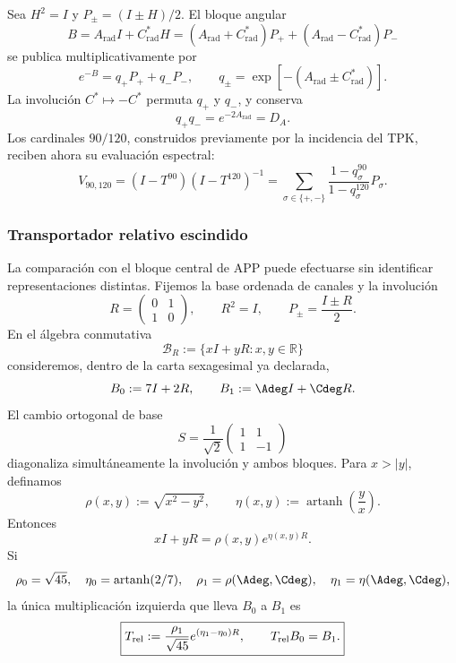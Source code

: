 Sea \(H^2=I\) y \(P_\pm=(I\pm H)/2\). El bloque angular
\begin{equation}
 B=A_{\mathrm{rad}}I+C^*_{\mathrm{rad}}H
 =(A_{\mathrm{rad}}+C^*_{\mathrm{rad}})P_+
 +(A_{\mathrm{rad}}-C^*_{\mathrm{rad}})P_-
 \label{eq:l9s102:b-angular}
\end{equation}
se publica multiplicativamente por
\begin{equation}
 e^{-B}=q_+P_++q_-P_-,
 \qquad
 q_\pm=\exp[-(A_{\mathrm{rad}}\pm C^*_{\mathrm{rad}})].
 \label{eq:l9s102:qpm-angular}
\end{equation}
La involución \(C^*\mapsto-C^*\) permuta \(q_+\) y \(q_-\), y conserva
\begin{equation}
 q_+q_-=e^{-2A_{\mathrm{rad}}}=D_A.
 \label{eq:l9s102:det-angular}
\end{equation}
Los cardinales \(90/120\), construidos previamente por la incidencia del
TPK, reciben ahora su evaluación espectral:
\begin{equation}
 V_{90,120}
 =(I-T^{90})(I-T^{120})^{-1}
 =\sum_{\sigma\in\{+,-\}}
 \frac{1-q_\sigma^{90}}{1-q_\sigma^{120}}P_\sigma.
 \label{eq:l9s102:v90120-posterior}
\end{equation}
\subsubsection{Transportador relativo escindido}
\label{sec:s102:c38:6:3:1}

\label{p3-20260826:sec:transportador-relativo-split}

La comparación con el bloque central de APP puede efectuarse sin identificar
representaciones distintas. Fijemos la base ordenada de canales y la
involución
\[
 R=\begin{pmatrix}0&1\\1&0\end{pmatrix},
 \qquad R^2=I,
 \qquad
 P_\pm=\frac{I\pm R}{2}.
\]
En el álgebra conmutativa
\[
 \mathscr B_R:=\{xI+yR:x,y\in\mathbb R\}
\]
consideremos, dentro de la carta sexagesimal ya declarada,
\[
 B_0:=7I+2R,
 \qquad
 B_1:=\Adeg I+\Cdeg R.
\]
El cambio ortogonal de base
\[
 S=\frac1{\sqrt2}
 \begin{pmatrix}1&1\\1&-1\end{pmatrix}
\]
diagonaliza simultáneamente la involución y ambos bloques. Para \(x>|y|\),
definamos
\[
 \rho(x,y):=\sqrt{x^2-y^2},
 \qquad
 \eta(x,y):=\operatorname{artanh}\!\left(\frac yx\right).
\]
Entonces
\[
 xI+yR=\rho(x,y)e^{\eta(x,y)R}.
\]
Si
\[
 \rho_0=\sqrt{45},\quad
 \eta_0=\operatorname{artanh}(2/7),\quad
 \rho_1=\rho(\Adeg,\Cdeg),\quad
 \eta_1=\eta(\Adeg,\Cdeg),
\]
la única multiplicación izquierda que lleva \(B_0\) a \(B_1\) es
\[
 \boxed{
 T_{\rm rel}
 :=\frac{\rho_1}{\sqrt{45}}
 e^{(\eta_1-\eta_0)R},
 \qquad
 T_{\rm rel}B_0=B_1.}
\]

